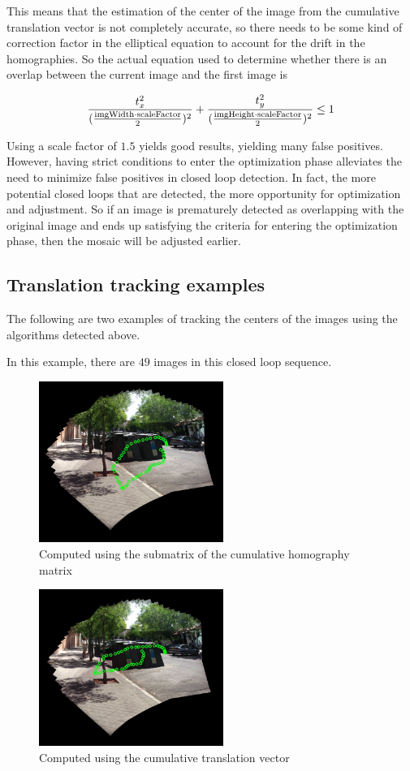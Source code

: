 \documentclass{article}
\begin{document}
This means that the estimation of the center of the image from the cumulative
translation vector is not completely accurate, so there needs to be some kind
of correction factor in the elliptical equation to account for the drift in the
homographies. So the actual equation used to determine whether there is an
overlap between the current image and the first image is

\[\frac{t_x^2}{(\frac{\textnormal{imgWidth} \cdot \textnormal{scaleFactor}}{2})^2} + \frac{t_y^2}{(\frac{\textnormal{imgHeight} \cdot \textnormal{scaleFactor}}{2})^2} \leq 1\]

Using a scale factor of $1.5$ yields good results, yielding many false
positives. However, having strict conditions to enter the optimization phase
alleviates the need to minimize false positives in closed loop detection. In
fact, the more potential closed loops that are detected, the more opportunity
for optimization and adjustment. So if an image is prematurely detected as
overlapping with the original image and ends up satisfying the criteria for
entering the optimization phase, then the mosaic will be adjusted earlier.

\subsection{Translation tracking examples}

The following are two examples of tracking the centers of the images using the
algorithms detected above. 

In this example, there are $49$ images in this closed loop sequence. 

\begin{figure}[ht!]
\centering
\includegraphics[width=6cm]{centers_imgs/test_set_15_nKRt_YES/moswithtrans0049_edit.jpg}
\caption{Computed using the submatrix of the cumulative homography matrix}
\end{figure} 

\begin{figure}[ht!]
\centering
\includegraphics[width=6cm]{centers_imgs/test_set_15_tcum_YES/moswithtrans0049_edit.jpg}
\caption{Computed using the cumulative translation vector}
\end{figure}
\end{document}
